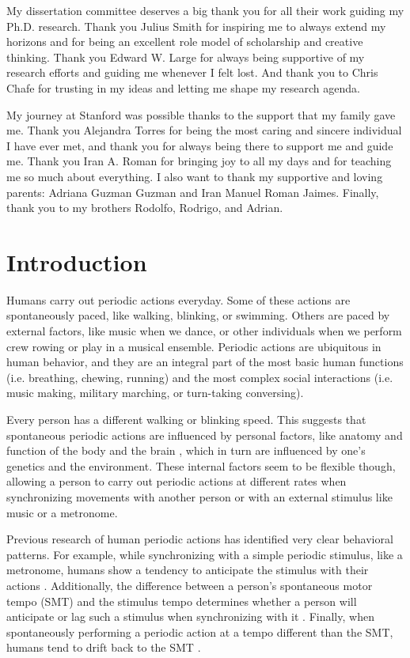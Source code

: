 \documentclass{report}
\begin{document}
My dissertation committee deserves a big thank you for all their work guiding my Ph.D. research. Thank you Julius Smith for inspiring me to always extend my horizons and for being an excellent role model of scholarship and creative thinking. Thank you Edward W. Large for always being supportive of my research efforts and guiding me whenever I felt lost. And thank you to Chris Chafe for trusting in my ideas and letting me shape my research agenda. 

My journey at Stanford was possible thanks to the support that my family gave me. Thank you Alejandra Torres for being the most caring and sincere individual I have ever met, and thank you for always being there to support me and guide me. Thank you Iran A. Roman for bringing joy to all my days and for teaching me so much about everything. I also want to thank my supportive and loving parents: Adriana Guzman Guzman and Iran Manuel Roman Jaimes. Finally, thank you to my brothers Rodolfo, Rodrigo, and Adrian.

\afterpreface

\chapter{Introduction}

Humans carry out periodic actions everyday. Some of these actions are spontaneously paced, like walking, blinking, or swimming. Others are paced by external factors, like music when we dance, or other individuals when we perform crew rowing or play in a musical ensemble. Periodic actions are ubiquitous in human behavior, and they are an integral part of the most basic human functions (i.e. breathing, chewing, running) and the most complex social interactions (i.e. music making, military marching, or turn-taking conversing).

Every person has a different walking or blinking speed. This suggests that spontaneous periodic actions are influenced by personal factors, like anatomy and function of the body \cite{goodman2000advantages} and the brain \cite{latash1992virtual}, which in turn are influenced by one's genetics and the environment. These internal factors seem to be flexible though, allowing a person to carry out periodic actions at different rates when synchronizing movements with another person or with an external stimulus like music or a metronome. 

Previous research of human periodic actions has identified very clear behavioral patterns. For example, while synchronizing with a simple periodic stimulus, like a metronome, humans show a tendency to anticipate the stimulus with their actions \cite{repp2007tapping}. Additionally, the difference between a person's spontaneous motor tempo (SMT) and the stimulus tempo determines whether a person will anticipate or lag such a stimulus when synchronizing with it \cite{scheurich2018tapping}. Finally, when spontaneously performing a periodic action at a tempo different than the SMT, humans tend to drift back to the SMT \cite{zamm2018musicians}. 
\end{document}
